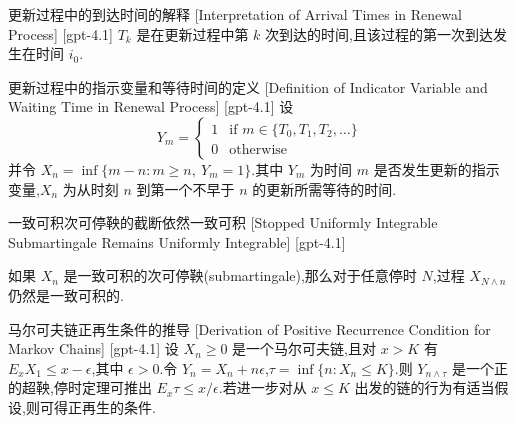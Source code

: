 \documentclass[UTF8]{ctexart}
\begin{document}
    
    
    \begin{dfn}
        {更新过程中的到达时间的解释}
        [Interpretation of Arrival Times in Renewal Process]
        [gpt-4.1]
        $T_{k}$ 是在更新过程中第 $k$ 次到达的时间,且该过程的第一次到达发生在时间 $i_{0}$.
    \end{dfn}
    
    
    
    \begin{dfn}
        {更新过程中的指示变量和等待时间的定义}
        [Definition of Indicator Variable and Waiting Time in Renewal Process]
        [gpt-4.1]
        设
\[
Y_{m} =
\begin{cases}
1 & \text{if } m \in \{ T_{0}, T_{1}, T_{2}, \dots \} \\
0 & \text{otherwise}
\end{cases}
\]
并令 $X_{n} = \inf \{ m - n : m \geq n, \ Y_{m} = 1 \}$.其中 $Y_{m}$ 为时间 $m$ 是否发生更新的指示变量,$X_{n}$ 为从时刻 $n$ 到第一个不早于 $n$ 的更新所需等待的时间.
    \end{dfn}
    
    
    
    \begin{thm}
        {一致可积次可停鞅的截断依然一致可积}
        [Stopped Uniformly Integrable Submartingale Remains Uniformly Integrable]
        [gpt-4.1]
        
如果 $X_{n}$ 是一致可积的次可停鞅(submartingale),那么对于任意停时 $N$,过程 $X_{N \wedge n}$ 仍然是一致可积的.

    \end{thm}
    
    
    
    \begin{thm}
        {马尔可夫链正再生条件的推导}
        [Derivation of Positive Recurrence Condition for Markov Chains]
        [gpt-4.1]
        设 $X_n \geq 0$ 是一个马尔可夫链,且对 $x > K$ 有 $E_x X_1 \leq x - \epsilon$,其中 $\epsilon > 0$.令 $Y_n = X_n + n\epsilon$,$\tau = \operatorname*{inf}\{ n : X_n \leq K \}$.则 $Y_{n \wedge \tau}$ 是一个正的超鞅,停时定理可推出 $E_x \tau \leq x / \epsilon$.若进一步对从 $x \leq K$ 出发的链的行为有适当假设,则可得正再生的条件.

    \end{thm}
    
\end{document}
